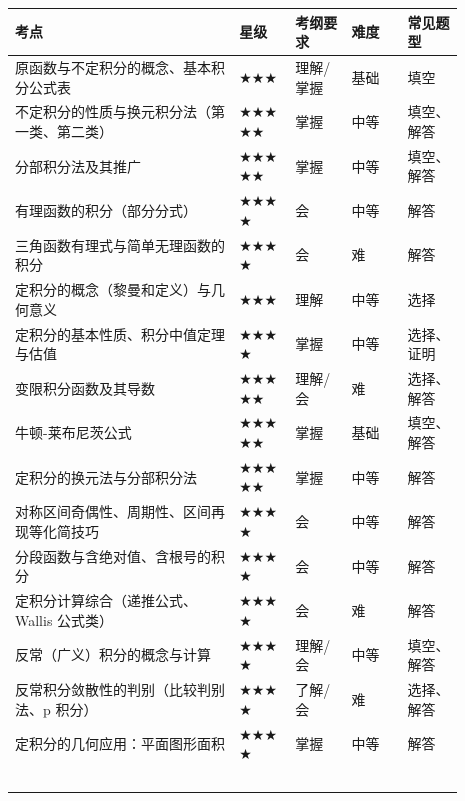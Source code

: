 \documentclass[11pt,openany,UTF8]{ctexbook}
\begin{document}
\begingroup\small\setlength{\tabcolsep}{4.0pt}
\begin{longtable}{@{}L{0.4434\linewidth}L{0.1127\linewidth}L{0.1127\linewidth}L{0.1127\linewidth}L{0.1127\linewidth}@{}}
\toprule
\textbf{考点} & \textbf{星级} & \textbf{考纲要求} & \textbf{难度} & \textbf{常见题型} \\
\midrule
\endhead
原函数与不定积分的概念、基本积分公式表 & $\bigstar$$\bigstar$$\bigstar$ & 理解/掌握 & 基础 & 填空 \\
不定积分的性质与换元积分法（第一类、第二类） & $\bigstar$$\bigstar$$\bigstar$$\bigstar$$\bigstar$ & 掌握 & 中等 & 填空、解答 \\
分部积分法及其推广 & $\bigstar$$\bigstar$$\bigstar$$\bigstar$$\bigstar$ & 掌握 & 中等 & 填空、解答 \\
有理函数的积分（部分分式） & $\bigstar$$\bigstar$$\bigstar$$\bigstar$ & 会 & 中等 & 解答 \\
三角函数有理式与简单无理函数的积分 & $\bigstar$$\bigstar$$\bigstar$$\bigstar$ & 会 & 难 & 解答 \\
定积分的概念（黎曼和定义）与几何意义 & $\bigstar$$\bigstar$$\bigstar$ & 理解 & 中等 & 选择 \\
定积分的基本性质、积分中值定理与估值 & $\bigstar$$\bigstar$$\bigstar$$\bigstar$ & 掌握 & 中等 & 选择、证明 \\
变限积分函数及其导数 & $\bigstar$$\bigstar$$\bigstar$$\bigstar$$\bigstar$ & 理解/会 & 难 & 选择、解答 \\
牛顿-莱布尼茨公式 & $\bigstar$$\bigstar$$\bigstar$$\bigstar$$\bigstar$ & 掌握 & 基础 & 填空、解答 \\
定积分的换元法与分部积分法 & $\bigstar$$\bigstar$$\bigstar$$\bigstar$$\bigstar$ & 掌握 & 中等 & 解答 \\
对称区间奇偶性、周期性、区间再现等化简技巧 & $\bigstar$$\bigstar$$\bigstar$$\bigstar$ & 会 & 中等 & 解答 \\
分段函数与含绝对值、含根号的积分 & $\bigstar$$\bigstar$$\bigstar$$\bigstar$ & 会 & 中等 & 解答 \\
定积分计算综合（递推公式、Wallis 公式类） & $\bigstar$$\bigstar$$\bigstar$$\bigstar$ & 会 & 难 & 解答 \\
反常（广义）积分的概念与计算 & $\bigstar$$\bigstar$$\bigstar$$\bigstar$ & 理解/会 & 中等 & 填空、解答 \\
反常积分敛散性的判别（比较判别法、p 积分） & $\bigstar$$\bigstar$$\bigstar$$\bigstar$ & 了解/会 & 难 & 选择、解答 \\
定积分的几何应用：平面图形面积 & $\bigstar$$\bigstar$$\bigstar$$\bigstar$ & 掌握 & 中等 & 解答 \\
$$
\end{longtable}
\end{document}
